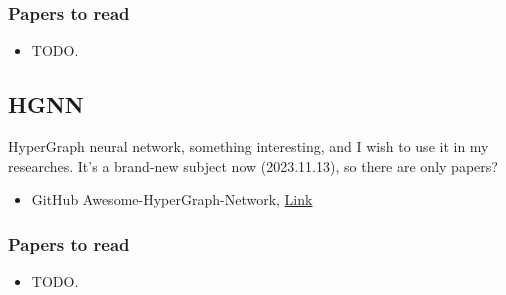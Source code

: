 \documentclass{article}
\begin{document}
\subsubsection{Papers to read}
\begin{itemize}
    \item TODO.
\end{itemize}
\subsection{HGNN}
\par HyperGraph neural network, something interesting, and I wish to use it in my researches. It's a brand-new subject now (2023.11.13), so there are only papers?
\begin{itemize}
    \item GitHub Awesome-HyperGraph-Network, \href{https://github.com/gzcsudo/Awesome-Hypergraph-Network}{Link}
\end{itemize}
\subsubsection{Papers to read}
\begin{itemize}
    \item TODO.
\end{itemize}
\end{document}
